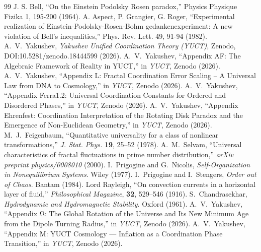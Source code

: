 \documentclass[11pt,a4paper]{article}
\begin{document}
\begin{thebibliography}{99}
		 J. S. Bell, ``On the Einstein Podolsky Rosen paradox,'' Physics Physique Fizika 1, 195-200 (1964).
		 A. Aspect, P. Grangier, G. Roger, ``Experimental realization of Einstein-Podolsky-Rosen-Bohm gedankenexperiment: A new violation of Bell's inequalities,'' Phys. Rev. Lett. 49, 91-94 (1982).
		 A.~V.~Yakushev, \emph{Yakushev Unified Coordination Theory (YUCT)}, Zenodo, DOI:10.5281/zenodo.18444599 (2026).
		 A.~V.~Yakushev, ``Appendix AF: The Algebraic Framework of Reality in YUCT,'' in \emph{YUCT}, Zenodo (2026).
		 A.~V.~Yakushev, ``Appendix L: Fractal Coordination Error Scaling – A Universal Law from DNA to Cosmology,'' in \emph{YUCT}, Zenodo (2026).
		 A.~V.~Yakushev, ``Appendix Ferra1.2: Universal Coordination Constants for Ordered and Disordered Phases,'' in \emph{YUCT}, Zenodo (2026).
		 A.~V.~Yakushev, ``Appendix Ehrenfest: Coordination Interpretation of the Rotating Disk Paradox and the Emergence of Non‑Euclidean Geometry,'' in \emph{YUCT}, Zenodo (2026).
		 M.~J.~Feigenbaum, ``Quantitative universality for a class of nonlinear transformations,'' \emph{J. Stat. Phys.} \textbf{19}, 25--52 (1978).
		 A.~M.~Selvam, ``Universal characteristics of fractal fluctuations in prime number distribution,'' \emph{arXiv preprint physics/0008010} (2000).
		 I.~Prigogine and G.~Nicolis, \emph{Self-Organization in Nonequilibrium Systems}. Wiley (1977).
		 I.~Prigogine and I.~Stengers, \emph{Order out of Chaos}. Bantam (1984).
		 Lord Rayleigh, ``On convection currents in a horizontal layer of fluid,'' \emph{Philosophical Magazine}, \textbf{32}, 529--546 (1916).
		 S.~Chandrasekhar, \emph{Hydrodynamic and Hydromagnetic Stability}. Oxford (1961).
		 A.~V.~Yakushev, ``Appendix Ω: The Global Rotation of the Universe and Its New Minimum Age from the Dipole Turning Radius,'' in \emph{YUCT}, Zenodo (2026).
		 A.~V.~Yakushev, ``Appendix M: YUCT Cosmology — Inflation as a Coordination Phase Transition,'' in \emph{YUCT}, Zenodo (2026).
	\end{thebibliography}
	
\end{document}
